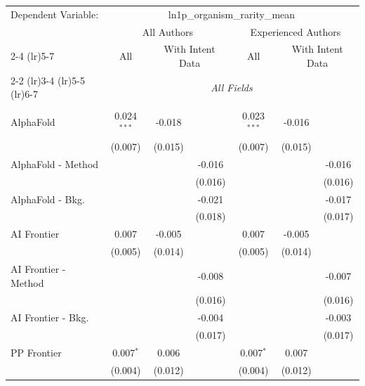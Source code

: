 \begingroup
\centering
\begin{tabular}{lcccccc}
   \tabularnewline \midrule \midrule
   Dependent Variable: & \multicolumn{6}{c}{ln1p\_organism\_rarity\_mean}\\
 & \multicolumn{3}{c}{All Authors} & \multicolumn{3}{c}{Experienced Authors} \\
\cmidrule(lr){2-4} \cmidrule(lr){5-7}
 & \multicolumn{1}{c}{All} & \multicolumn{2}{c}{With Intent Data} & \multicolumn{1}{c}{All} & \multicolumn{2}{c}{With Intent Data} \\
\cmidrule(lr){2-2} \cmidrule(lr){3-4} \cmidrule(lr){5-5} \cmidrule(lr){6-7}
 & \multicolumn{6}{c}{\textit{All Fields}} \\ \\
   AlphaFold            & 0.024$^{***}$ & -0.018  &         & 0.023$^{***}$ & -0.016  &   \\   
                        & (0.007)       & (0.015) &         & (0.007)       & (0.015) &   \\   
   AlphaFold - Method   &               &         & -0.016  &               &         & -0.016\\   
                        &               &         & (0.016) &               &         & (0.016)\\   
   AlphaFold - Bkg.     &               &         & -0.021  &               &         & -0.017\\   
                        &               &         & (0.018) &               &         & (0.017)\\   
   AI Frontier          & 0.007         & -0.005  &         & 0.007         & -0.005  &   \\   
                        & (0.005)       & (0.014) &         & (0.005)       & (0.014) &   \\   
   AI Frontier - Method &               &         & -0.008  &               &         & -0.007\\   
                        &               &         & (0.016) &               &         & (0.016)\\   
   AI Frontier - Bkg.   &               &         & -0.004  &               &         & -0.003\\   
                        &               &         & (0.017) &               &         & (0.017)\\   
   PP Frontier          & 0.007$^{*}$   & 0.006   &         & 0.007$^{*}$   & 0.007   &   \\   
                        & (0.004)       & (0.012) &         & (0.004)       & (0.012) &   \\   

\end{tabular}
